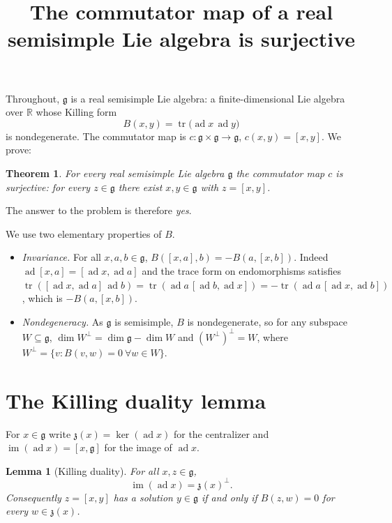 \documentclass{amsart}
\newtheorem{theorem}{Theorem}
\newtheorem{lemma}{Lemma}
\theoremstyle{definition}
\begin{document}
\title{The commutator map of a real semisimple Lie algebra is surjective}
\maketitle

Throughout, $\mathfrak g$ is a real semisimple Lie algebra: a finite-dimensional
Lie algebra over $\mathbb R$ whose Killing form
\[
  B(x,y)=\operatorname{tr}\bigl(\operatorname{ad}x\,\operatorname{ad}y\bigr)
\]
is nondegenerate. The commutator map is $c\colon\mathfrak g\times\mathfrak g\to\mathfrak g$,
$c(x,y)=[x,y]$. We prove:

\begin{theorem}\label{thm:main}
For every real semisimple Lie algebra $\mathfrak g$ the commutator map $c$ is
surjective: for every $z\in\mathfrak g$ there exist $x,y\in\mathfrak g$ with
$z=[x,y]$.
\end{theorem}

The answer to the problem is therefore \emph{yes}.

\medskip
We use two elementary properties of $B$.
\begin{itemize}
\item[(K1)] \emph{Invariance.} For all $x,a,b\in\mathfrak g$,
  $B([x,a],b)=-B(a,[x,b])$. Indeed
  $\operatorname{ad}[x,a]=[\operatorname{ad}x,\operatorname{ad}a]$ and the trace
  form on endomorphisms satisfies
  $\operatorname{tr}([\operatorname{ad}x,\operatorname{ad}a]\,\operatorname{ad}b)
  =\operatorname{tr}(\operatorname{ad}a\,[\operatorname{ad}b,\operatorname{ad}x])
  =-\operatorname{tr}(\operatorname{ad}a\,[\operatorname{ad}x,\operatorname{ad}b])$,
  which is $-B(a,[x,b])$.
\item[(K2)] \emph{Nondegeneracy.} As $\mathfrak g$ is semisimple, $B$ is
  nondegenerate, so for any subspace $W\subseteq\mathfrak g$,
  $\dim W^{\perp}=\dim\mathfrak g-\dim W$ and $(W^{\perp})^{\perp}=W$, where
  $W^{\perp}=\{v:B(v,w)=0\ \forall w\in W\}$.
\end{itemize}

\section{The Killing duality lemma}

For $x\in\mathfrak g$ write $\mathfrak z(x)=\ker(\operatorname{ad}x)$ for the
centralizer and $\operatorname{im}(\operatorname{ad}x)=[x,\mathfrak g]$ for the
image of $\operatorname{ad}x$.

\begin{lemma}[Killing duality]\label{lem:duality}
For all $x,z\in\mathfrak g$,
\[
  \operatorname{im}(\operatorname{ad}x)=\mathfrak z(x)^{\perp}.
\]
Consequently $z=[x,y]$ has a solution $y\in\mathfrak g$ if and only if
$B(z,w)=0$ for every $w\in\mathfrak z(x)$.
\end{lemma}
\end{document}
